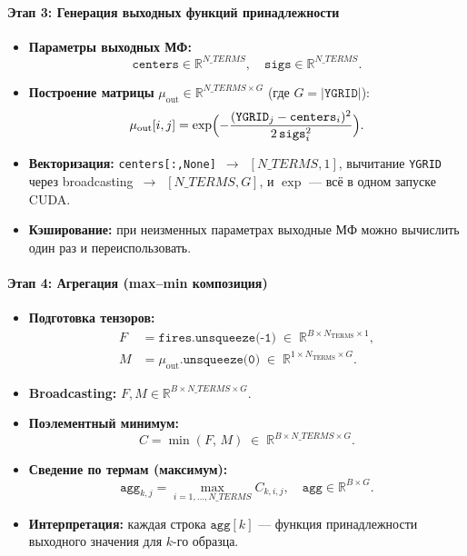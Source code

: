 \paragraph{Этап 3: Генерация выходных функций принадлежности}  
\begin{itemize}
  \item {\bf Параметры выходных МФ:}  
    $$
      \texttt{centers}\in\mathbb{R}^{N\_{TERMS}},\quad
      \texttt{sigs}\in\mathbb{R}^{N\_{TERMS}}.
    $$
  \item {\bf Построение матрицы} $\mu_{\text{out}}\in\mathbb{R}^{N\_{TERMS}\times G}$  
    (где $G = |\texttt{YGRID}|$):  
    $$
      \mu_{\text{out}}[i,j]
      = \exp\Bigl(
          -\frac{(\texttt{YGRID}_j - \texttt{centers}_i)^2}
                {2\,\texttt{sigs}_i^2}
        \Bigr).
    $$
  \item {\bf Векторизация:}  
    \texttt{centers[:,None]}~$\to$~$[N\_{TERMS},1]$,  
    вычитание \texttt{YGRID} через broadcasting~$\to$~$[N\_{TERMS},G]$,  
    и $\exp$ — всё в одном запуске CUDA.
  \item {\bf Кэширование:}  
    при неизменных параметрах выходные МФ можно вычислить один раз и переиспользовать.
\end{itemize}

\paragraph{Этап 4: Агрегация (max–min композиция)}  
\begin{itemize}
  \item {\bf Подготовка тензоров:}  
  \[
    \begin{split}
      F &= \texttt{fires.unsqueeze(-1)}
            \;\in\;\mathbb{R}^{B\times N_{\text{TERMS}}\times 1},\\
      M &= \mu_{\text{out}}.\texttt{unsqueeze(0)}
            \;\in\;\mathbb{R}^{1\times N_{\text{TERMS}}\times G}.
    \end{split}
  \]
  \item {\bf Broadcasting:}  
    $F,M\in\mathbb{R}^{B\times N\_{TERMS}\times G}$.
  \item {\bf Поэлементный минимум:}  
    $$
      C = \min(F,\,M)
      \;\in\;\mathbb{R}^{B\times N\_{TERMS}\times G}.
    $$
  \item {\bf Сведение по термам (максимум):}  
    $$
      \texttt{agg}_{k,j}
      = \max_{i=1,\dots,N\_{TERMS}} C_{k,i,j},
      \quad \texttt{agg}\in\mathbb{R}^{B\times G}.
    $$
  \item {\bf Интерпретация:}  
    каждая строка $\texttt{agg}[k]$ — функция принадлежности выходного значения для $k$-го образца.
\end{itemize}

